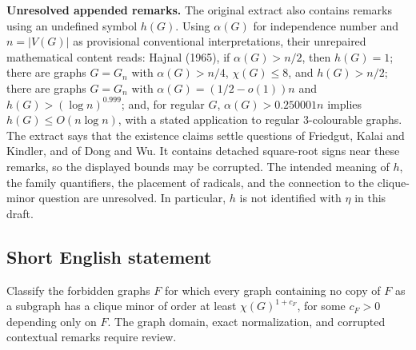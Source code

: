 \documentclass[11pt]{article}
\begin{document}
\textbf{Unresolved appended remarks.} The original extract also contains remarks using an undefined symbol \(h(G)\). Using \(\alpha(G)\) for independence number and \(n=|V(G)|\) as provisional conventional interpretations, their unrepaired mathematical content reads: Hajnal (1965), if \(\alpha(G)>n/2\), then \(h(G)=1\); there are graphs \(G=G_n\) with \(\alpha(G)>n/4\), \(\chi(G)\leq8\), and \(h(G)>n/2\); there are graphs \(G=G_n\) with \(\alpha(G)=(1/2-o(1))n\) and \(h(G)>(\log n)^{0.999}\); and, for regular \(G\), \(\alpha(G)>0.250001n\) implies \(h(G)\leq O(n\log n)\), with a stated application to regular \(3\)-colourable graphs. The extract says that the existence claims settle questions of Friedgut, Kalai and Kindler, and of Dong and Wu. It contains detached square-root signs near these remarks, so the displayed bounds may be corrupted. The intended meaning of \(h\), the family quantifiers, the placement of radicals, and the connection to the clique-minor question are unresolved. In particular, \(h\) is not identified with \(\eta\) in this draft.
\subsection{Short English statement}
Classify the forbidden graphs \(F\) for which every graph containing no copy of \(F\) as a subgraph has a clique minor of order at least \(\chi(G)^{1+c_F}\), for some \(c_F>0\) depending only on \(F\). The graph domain, exact normalization, and corrupted contextual remarks require review.
\end{document}

